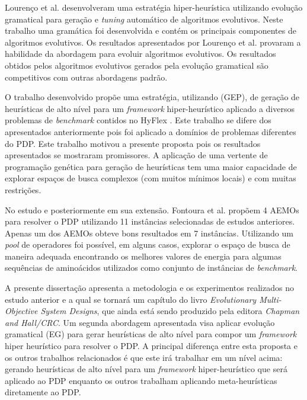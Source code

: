 Lourenço et al. \cite{lourencco2012evolving} desenvolveram uma estratégia hiper-heurística utilizando evolução gramatical para geração e \textit{tuning} automático de algoritmos evolutivos. Neste trabalho uma gramática foi desenvolvida e contém os principais componentes de algoritmos evolutivos. Os resultados apresentados por Lourenço et al. provaram a habilidade da abordagem para evoluir algoritmos evolutivos. Os resultados obtidos pelos algoritmos evolutivos gerados pela evolução gramatical são competitivos com outras abordagens padrão. 



O trabalho desenvolvido \cite{sabar2015automatic} propõe uma estratégia, utilizando  (GEP), de geração de heurísticas de alto nível para um \textit {framework} hiper-heurístico aplicado a diversos problemas de \textit{benchmark} contidos no  HyFlex \cite{ochoa2012hyflex}. Este trabalho se difere dos apresentados anteriormente pois foi aplicado a domínios de problemas diferentes do PDP. Este trabalho motivou a presente proposta pois os resultados apresentados se mostraram promissores. A aplicação de uma vertente de programação genética para geração de heurísticas tem uma maior capacidade de explorar espaços de busca complexos (com muitos mínimos locais) e com muitas restrições.

No estudo \cite{fontouralimacbic2015} e posteriormente em sua extensão. Fontoura et al. propõem 4 AEMOs para resolver o PDP utilizando 11 instâncias selecionadas de estudos anteriores. Apenas um dos AEMOs obteve bons resultados em 7 instâncias. Utilizando um \textit{pool} de operadores foi possível, em alguns casos,  explorar o espaço de busca de maneira adequada encontrando os melhores valores de energia para algumas sequências  de aminoácidos utilizados como conjunto de instâncias de \textit{benchmark}.



A presente dissertação apresenta a metodologia e os experimentos realizados no estudo anterior \cite{fontouralimacbic2015} e a qual se tornará um capítulo do livro \textit{Evolutionary Multi-Objective System Designs}, que ainda está sendo produzido pela editora \textit{Chapman and Hall/CRC}. Um segunda abordagem apresentada visa aplicar evolução gramatical (EG) para gerar heurísticas de alto nível para compor um \textit{framework} hiper heurístico para resolver o PDP. A principal diferença entre esta proposta e os outros trabalhos relacionados \cite{santana2008protein,shmygelska2002ant,shmygelska2003improved,hsu2003growth, krasnogor2002multimeme,krasnogor2002multimeme,unger1993genetic} é que este irá trabalhar em um nível acima: gerando heurísticas de alto nível para um \textit{framework} hiper-heurístico que será aplicado ao PDP enquanto os outros trabalham aplicando meta-heurísticas diretamente ao PDP. 





